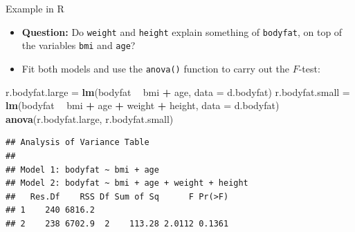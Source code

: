 \documentclass[10pt,ignorenonframetext,]{beamer}
\newenvironment{Shaded}{\begin{snugshade}}{\end{snugshade}}
\newcommand{\KeywordTok}[1]{\textcolor[rgb]{0.13,0.29,0.53}{\textbf{#1}}}
\newcommand{\DataTypeTok}[1]{\textcolor[rgb]{0.13,0.29,0.53}{#1}}
\newcommand{\StringTok}[1]{\textcolor[rgb]{0.31,0.60,0.02}{#1}}
\newcommand{\OperatorTok}[1]{\textcolor[rgb]{0.81,0.36,0.00}{\textbf{#1}}}
\newcommand{\NormalTok}[1]{#1}
\begin{document}
\begin{frame}[fragile]

\begin{block}{Example in R}

\begin{itemize}
\item
  \textbf{Question:} Do \texttt{weight} and \texttt{height} explain
  something of \texttt{bodyfat}, on top of the variables \texttt{bmi}
  and \texttt{age}?
\item
  Fit both models and use the \texttt{anova()} function to carry out the
  \(F\)-test:
\end{itemize}

\footnotesize

\begin{Shaded}
\begin{Highlighting}[]
\NormalTok{r.bodyfat.large =}\StringTok{ }\KeywordTok{lm}\NormalTok{(bodyfat }\OperatorTok{~}\StringTok{ }\NormalTok{bmi }\OperatorTok{+}\StringTok{ }\NormalTok{age, }\DataTypeTok{data =}\NormalTok{ d.bodyfat)}
\NormalTok{r.bodyfat.small =}\StringTok{ }\KeywordTok{lm}\NormalTok{(bodyfat }\OperatorTok{~}\StringTok{ }\NormalTok{bmi }\OperatorTok{+}\StringTok{ }\NormalTok{age }\OperatorTok{+}\StringTok{ }\NormalTok{weight }\OperatorTok{+}\StringTok{ }\NormalTok{height, }\DataTypeTok{data =}\NormalTok{ d.bodyfat)}
\KeywordTok{anova}\NormalTok{(r.bodyfat.large, r.bodyfat.small)}
\end{Highlighting}
\end{Shaded}

\begin{verbatim}
## Analysis of Variance Table
## 
## Model 1: bodyfat ~ bmi + age
## Model 2: bodyfat ~ bmi + age + weight + height
##   Res.Df    RSS Df Sum of Sq      F Pr(>F)
## 1    240 6816.2                           
## 2    238 6702.9  2    113.28 2.0112 0.1361
\end{verbatim}

\normalsize

\end{block}

\end{frame}
\end{document}
